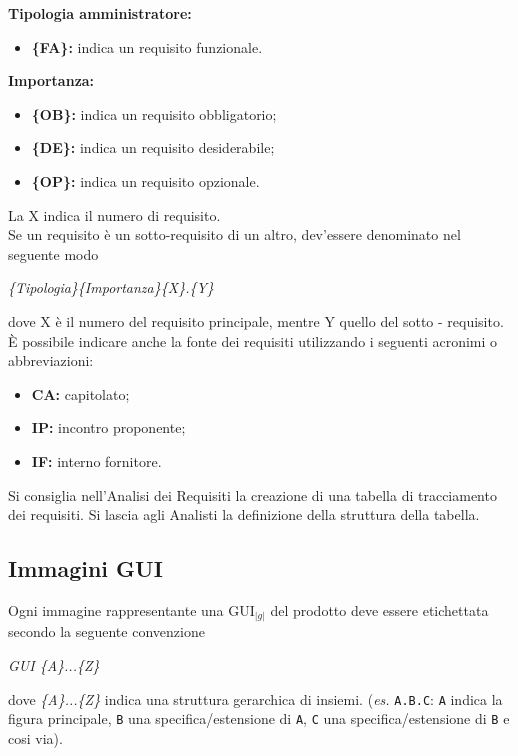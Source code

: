 {{		\textbf{Tipologia amministratore:}
		\begin{itemize}
			\item []\textbf {\{FA\}:} indica un requisito funzionale.
		\end{itemize}
		
		\textbf{Importanza:}	
		\begin{itemize}
			\item []\textbf{\{OB\}:} indica un requisito obbligatorio; 
			\item []\textbf{\{DE\}:} indica un requisito desiderabile;
			\item []\textbf{\{OP\}:} indica un requisito opzionale.
		\end{itemize}
		
		La X indica il numero di requisito.\\
		Se un requisito è un sotto-requisito di un altro, dev'essere denominato nel seguente modo
		\begin{center}
			\textit{\{Tipologia\}\{Importanza\}\{X\}.\{Y\}}
		\end{center}
		dove X è il numero del requisito principale, mentre Y quello del sotto - requisito. \`E possibile indicare anche la fonte dei requisiti utilizzando i seguenti acronimi o abbreviazioni:
		\begin{itemize}
			\item []\textbf{CA:} capitolato;
			\item []\textbf{IP:}	incontro proponente;
			\item []\textbf{IF:} interno fornitore.
		\end{itemize}

		Si consiglia nell'Analisi dei Requisiti la creazione di una tabella di tracciamento dei requisiti. Si lascia agli Analisti la definizione della struttura della tabella.
	}
	
	\subsection{Immagini GUI}{Ogni immagine rappresentante una GUI$_{|g|}$ del prodotto deve essere etichettata secondo la seguente convenzione
	\begin{center}
		\textit{GUI \{A\}...\{Z\}}
	\end{center}
	
	dove \textit{\{A\}...\{Z\}} indica una struttura gerarchica di insiemi. (\textit{es.} \texttt{A.B.C}: \texttt{A} indica la figura principale, \texttt{B} una specifica/estensione di \texttt{A}, \texttt{C} una specifica/estensione di \texttt{B} e cosi via). 
}
	
}
